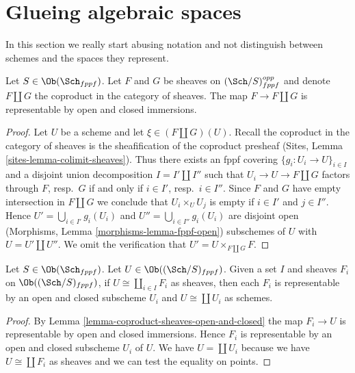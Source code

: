 \section{Glueing algebraic spaces}
\label{section-glueing-algebraic-spaces}

\noindent
In this section we really start abusing notation and not
distinguish between schemes and the spaces they represent.

\begin{lemma}
\label{lemma-coproduct-sheaves-open-and-closed}
Let $S \in \Ob(\Sch_{fppf})$. Let $F$ and $G$ be sheaves on
$(\Sch/S)_{fppf}^{opp}$ and denote $F \amalg G$ the coproduct
in the category of sheaves. The map $F \to F \amalg G$ is representable by
open and closed immersions.
\end{lemma}

\begin{proof}
Let $U$ be a scheme and let $\xi \in (F \amalg G)(U)$. Recall the
coproduct in the category of sheaves is the sheafification of
the coproduct presheaf (Sites, Lemma \ref{sites-lemma-colimit-sheaves}).
Thus there exists an fppf covering $\{g_i : U_i \to U\}_{i \in I}$
and a disjoint union decomposition $I = I' \amalg I''$ such that
$U_i \to U \to F \amalg G$ factors through $F$, resp.\ $G$
if and only if $i \in I'$, resp.\ $i \in I''$. Since $F$ and
$G$ have empty intersection in $F \amalg G$ we conclude that
$U_i \times_U U_j$ is empty if $i \in I'$ and $j \in I''$.
Hence $U' = \bigcup_{i \in I'} g_i(U_i)$ and
$U'' = \bigcup_{i \in I''} g_i(U_i)$ are disjoint open
(Morphisms, Lemma \ref{morphisms-lemma-fppf-open}) subschemes of $U$
with $U = U' \amalg U''$.
We omit the verification that $U' = U \times_{F \amalg G} F$.
\end{proof}

\begin{lemma}
\label{lemma-representable-sheaf-coproduct-sheaves}
Let $S \in \Ob(\Sch_{fppf})$.
Let $U \in \Ob((\Sch/S)_{fppf})$.
Given a set $I$ and sheaves $F_i$ on $\Ob((\Sch/S)_{fppf})$,
if $U \cong \coprod_{i\in I} F_i$
as sheaves, then each $F_i$ is representable by an open and closed
subscheme $U_i$ and $U \cong \coprod U_i$ as schemes.
\end{lemma}

\begin{proof}
By Lemma \ref{lemma-coproduct-sheaves-open-and-closed}
the map $F_i \to U$ is representable by open and closed immersions.
Hence $F_i$ is representable by an open and closed subscheme $U_i$ of $U$.
We have $U = \coprod U_i$ because we have $U \cong \coprod F_i$
as sheaves and we can test the equality on points.
\end{proof}

